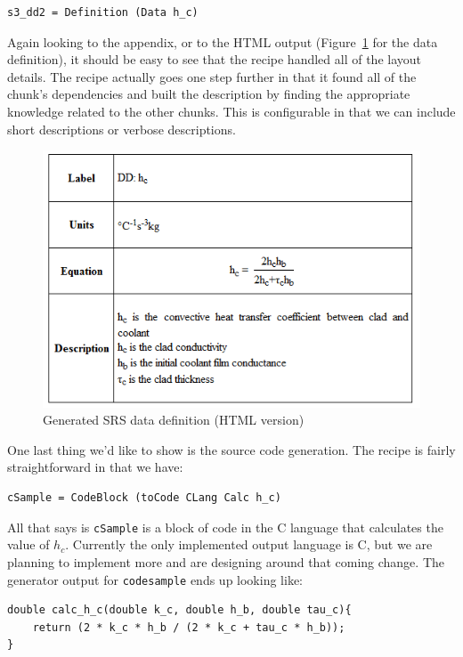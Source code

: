 \documentclass[preprint, 10pt]{sigplanconf}
\begin{document}
\begin{lstlisting}
s3_dd2 = Definition (Data h_c)
\end{lstlisting}

Again looking to the appendix, or to the HTML output (Figure~\ref{fig:HTML_s3} for
the data definition), it should be easy to see that the recipe handled all of
the layout details. The recipe actually goes one step further in that it found
all of the chunk's dependencies and built the description by finding the
appropriate knowledge related to the other chunks. This is configurable in that
we can include short descriptions or verbose descriptions.

\begin{figure}
\includegraphics[scale=0.6]{HTML_s3.png}
\caption{Generated SRS data definition (HTML version)}
\label{fig:HTML_s3}
\end{figure}

One last thing we'd like to show is the source code generation. The recipe is
fairly straightforward in that we have:

\begin{lstlisting}[basicstyle=\small]
cSample = CodeBlock (toCode CLang Calc h_c)
\end{lstlisting}

All that says is \verb|cSample| is a block of code in the C language that
calculates the value of $h_c$. Currently the only implemented output language is
C, but we are planning to implement more and are designing around that coming
change. The generator output for \verb|codesample| ends up looking like:

\begin{lstlisting}[frame=single, 
  showstringspaces=false, basicstyle=\scriptsize]
double calc_h_c(double k_c, double h_b, double tau_c){
    return (2 * k_c * h_b / (2 * k_c + tau_c * h_b));
}
\end{lstlisting}
\end{document}
